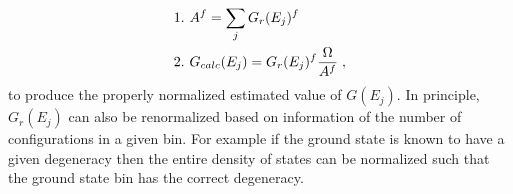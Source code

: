 \documentclass[aps,pre,reprint,superscriptaddress,showkeys]{revtex4-2}
\begin{document}
\begin{equation}
\begin{split}
&1. \hspace{0.125cm} A^f = \sum_jG_{r}(E_j)^f\\
&2. \hspace{0.125cm} G_{calc}(E_j) = G_{r}(E_j)^f \frac{\Omega}{A^f} \;,
\end{split}
\label{renormalize}
\end{equation}
to produce the properly normalized estimated value of $G(E_j)$. In principle, $G_{r}(E_j)$ can also be renormalized based on information of the number of configurations in a given bin. For example if the ground state is known to have a given degeneracy then the entire density of states can be normalized such that the ground state bin has the correct degeneracy. 

 
\end{document}
